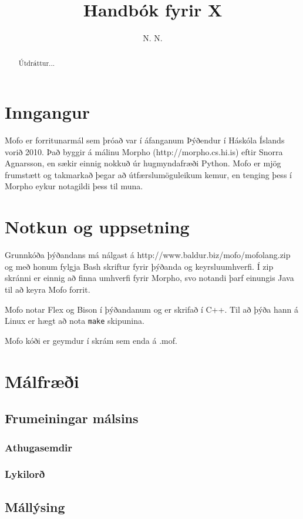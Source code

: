 \documentclass[12pt,a4paper]{article}
\begin{document}
\sloppy
\title{Handbók fyrir X}
\author{N. N.}
\maketitle

\begin{abstract}
Útdráttur...
\end{abstract}

\tableofcontents

\section{Inngangur}
Mofo er forritunarmál sem þróað var í áfanganum Þýðendur í Háskóla Íslands vorið 2010.
Það byggir á málinu Morpho (http://morpho.cs.hi.is) eftir Snorra Agnarsson, en sækir einnig nokkuð
úr hugmyndafræði Python.
Mofo er mjög frumstætt og takmarkað þegar að útfærslumöguleikum kemur, en tenging þess í Morpho eykur notagildi þess til muna.
\section{Notkun og uppsetning}
Grunnkóða þýðandans má nálgast á http://www.baldur.biz/mofo/mofolang.zip og með honum fylgja Bash skriftur fyrir
þýðanda og keyrsluumhverfi. Í zip skránni er einnig að finna umhverfi fyrir Morpho, svo notandi þarf einungis Java
til að keyra Mofo forrit.

Mofo notar Flex og Bison í þýðandanum og er skrifað í C++. Til að þýða hann á Linux er hægt að nota {\tt make} skipunina.

Mofo kóði er geymdur í skrám sem enda á .mof. 
\section{Málfræði}
\subsection{Frumeiningar málsins}
\subsubsection{Athugasemdir}
\subsubsection{Lykilorð}
\subsection{Mállýsing}
\end{document}
